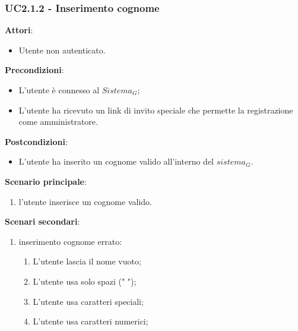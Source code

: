 \subsubsection{UC2.1.2 - Inserimento cognome}\label{usecase:2_1_2}
\textbf{Attori}:
\begin{itemize}
    \item Utente non autenticato.
\end{itemize}
\textbf{Precondizioni}:
\begin{itemize}
    \item L'utente è connesso al $\textit{Sistema}_G$;
    \item L'utente ha ricevuto un link di invito speciale che permette la registrazione come amministratore.
\end{itemize}
\textbf{Postcondizioni}:
\begin{itemize}
    \item L'utente ha inserito un cognome valido all'interno del $\textit{sistema}_G$.
\end{itemize}
\textbf{Scenario principale}:
\begin{enumerate}
    \item l'utente inserisce un cognome valido.
\end{enumerate}
\textbf{Scenari secondari}:

\begin{enumerate}
    \item inserimento cognome errato:
    \begin{enumerate}
        \item L'utente lascia il nome vuoto;
        \item L'utente usa solo spazi (" ");
        \item L'utente usa caratteri speciali;
        \item L'utente usa caratteri numerici;
    \end{enumerate}    
\end{enumerate}

